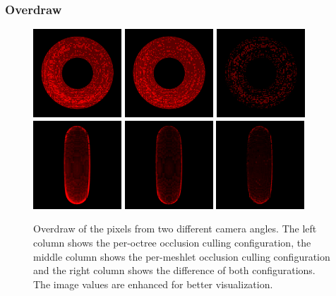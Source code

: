 \subsubsection*{Overdraw}

\begin{figure}[!htb]
  \centering
  \includegraphics[height=125px]{images/graphics/overdraw-torus1-pooc.png}
  \includegraphics[height=125px]{images/graphics/overdraw-torus1-pmoc.png}
  \includegraphics[height=125px]{images/graphics/overdraw-torus1-diff.png}
  \includegraphics[height=125px]{images/graphics/overdraw-torus2-pooc.png}
  \includegraphics[height=125px]{images/graphics/overdraw-torus2-pmoc.png}
  \includegraphics[height=125px]{images/graphics/overdraw-torus2-diff.png}
  \caption{Overdraw of the pixels from two different camera angles. The left column 
  shows the per-octree occlusion culling configuration, the middle column shows the 
  per-meshlet occlusion culling configuration and the right column shows the difference 
  of both configurations. The image values are enhanced for better visualization.}
  \label{fig:torus-overdraw}
\end{figure}

